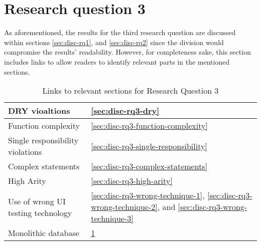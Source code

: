 \section{Research question 3} \label{sec:disc-rq3-monolithic-db}

As aforementioned, the results for the third research question are discussed within sections \ref{sec:disc-rq1}, and \ref{sec:disc-rq2} since the division would compromise the results' readability. However, for completeness sake, this section includes links to allow readers to identify relevant parts in the mentioned sections.


\begin{table}[!hbtp]
\centering
\begin{tabular}{|l|l|}

\hline

DRY vioaltions                     & \ref{sec:disc-rq3-dry}                                                                                               \\ \hline
Function complexity                & \ref{sec:disc-rq3-function-complexity}                                                                               \\ \hline
Single responsibility violations   & \ref{sec:disc-rq3-single-responsibility}                                                                             \\ \hline
Complex statements                 & \ref{sec:disc-rq3-complex-statements}                                                                                \\ \hline
High Arity                         & \ref{sec:disc-rq3-high-arity}                                                                                        \\ \hline
Use of wrong UI testing technology & \ref{sec:disc-rq3-wrong-technique-1}, \ref{sec:disc-rq3-wrong-technique-2}, and \ref{sec:disc-rq3-wrong-technique-3} \\ \hline
Monolithic database                & \ref{sec:disc-rq3-monolithic-db}    \\                                                                               \hline
\end{tabular}
\caption{Links to relevant sections for Research Question 3}
\label{tab:disc-rq3-links}
\end{table}